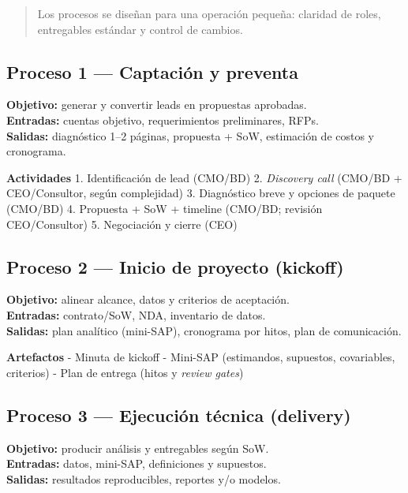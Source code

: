\documentclass[
  spanish,
]{article}
\begin{document}
\begin{quote}
Los procesos se diseñan para una operación pequeña: claridad de roles,
entregables estándar y control de cambios.
\end{quote}

\subsection{Proceso 1 --- Captación y
preventa}\label{proceso-1-captaciuxf3n-y-preventa}

\textbf{Objetivo:} generar y convertir leads en propuestas aprobadas.\\
\textbf{Entradas:} cuentas objetivo, requerimientos preliminares,
RFPs.\\
\textbf{Salidas:} diagnóstico 1--2 páginas, propuesta + SoW, estimación
de costos y cronograma.

\textbf{Actividades} 1. Identificación de lead (CMO/BD) 2.
\emph{Discovery call} (CMO/BD + CEO/Consultor, según complejidad) 3.
Diagnóstico breve y opciones de paquete (CMO/BD) 4. Propuesta + SoW +
timeline (CMO/BD; revisión CEO/Consultor) 5. Negociación y cierre (CEO)

\subsection{Proceso 2 --- Inicio de proyecto
(kickoff)}\label{proceso-2-inicio-de-proyecto-kickoff}

\textbf{Objetivo:} alinear alcance, datos y criterios de aceptación.\\
\textbf{Entradas:} contrato/SoW, NDA, inventario de datos.\\
\textbf{Salidas:} plan analítico (mini-SAP), cronograma por hitos, plan
de comunicación.

\textbf{Artefactos} - Minuta de kickoff - Mini-SAP (estimandos,
supuestos, covariables, criterios) - Plan de entrega (hitos y
\emph{review gates})

\subsection{Proceso 3 --- Ejecución técnica
(delivery)}\label{proceso-3-ejecuciuxf3n-tuxe9cnica-delivery}

\textbf{Objetivo:} producir análisis y entregables según SoW.\\
\textbf{Entradas:} datos, mini-SAP, definiciones y supuestos.\\
\textbf{Salidas:} resultados reproducibles, reportes y/o modelos.
\end{document}
